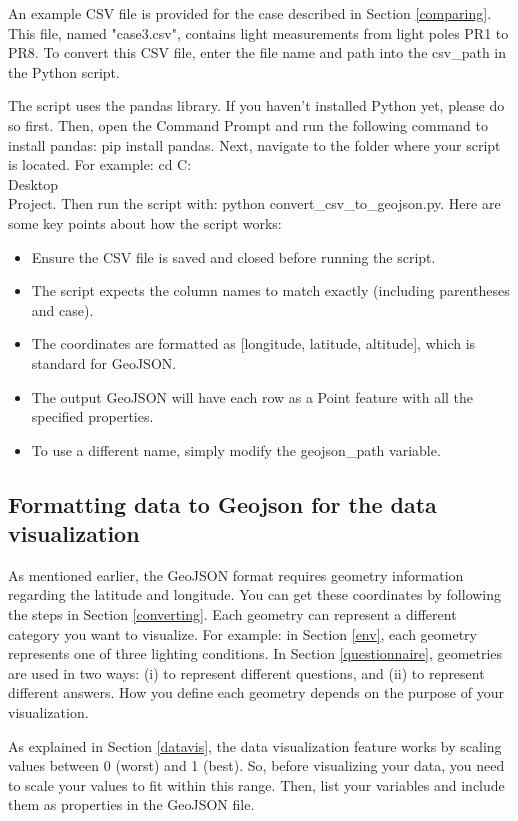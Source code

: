 An example CSV file is provided for the case described in Section \ref{comparing}. This file, named "case3.csv", contains light measurements from light poles PR1 to PR8. To convert this CSV file, enter the file name and path into the csv\_path in the Python script.

The script uses the pandas library. If you haven't installed Python yet, please do so first. Then, open the Command Prompt and run the following command to install pandas: pip install pandas. Next, navigate to the folder where your script is located. For example: cd C:\\Desktop\\Project. Then run the script with: python convert\_csv\_to\_geojson.py. Here are some key points about how the script works:
\begin{itemize}
    \item Ensure the CSV file is saved and closed before running the script.
    \item The script expects the column names to match exactly (including parentheses and case).
    \item The coordinates are formatted as [longitude, latitude, altitude], which is standard for GeoJSON.
    \item The output GeoJSON will have each row as a Point feature with all the specified properties.
    \item To use a different name, simply modify the geojson\_path variable.
\end{itemize}

\subsection{Formatting data to Geojson for the data visualization} \label{formatting}

As mentioned earlier, the GeoJSON format requires geometry information regarding the latitude and longitude. You can get these coordinates by following the steps in Section \ref{converting}. Each geometry can represent a different category you want to visualize. For example: in Section \ref{env}, each geometry represents one of three lighting conditions. In Section \ref{questionnaire}, geometries are used in two ways: (i) to represent different questions, and (ii) to represent different answers. How you define each geometry depends on the purpose of your visualization.

As explained in Section \ref{datavis}, the data visualization feature works by scaling values between 0 (worst) and 1 (best). So, before visualizing your data, you need to scale your values to fit within this range. Then, list your variables and include them as properties in the GeoJSON file.

